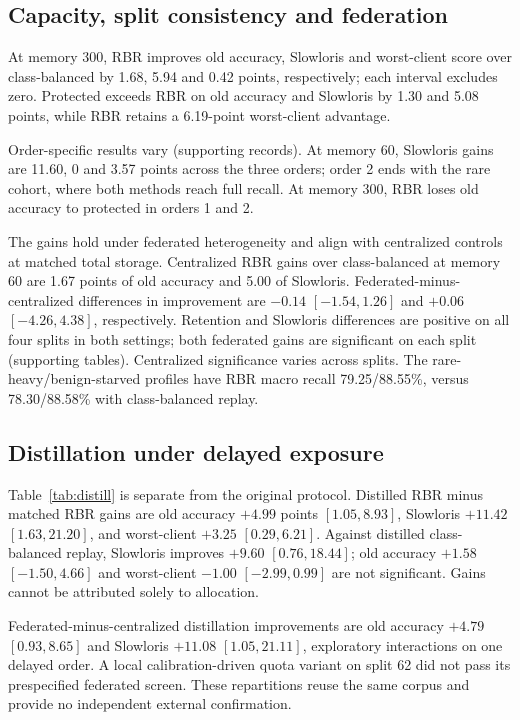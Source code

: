 \documentclass[journal,10pt]{IEEEtran}
\begin{document}
\subsection{Capacity, split consistency and federation}

At memory 300, RBR improves old accuracy, Slowloris and worst-client score over class-balanced by 1.68, 5.94 and 0.42 points, respectively; each interval excludes zero. Protected exceeds RBR on old accuracy and Slowloris by 1.30 and 5.08 points, while RBR retains a 6.19-point worst-client advantage.

Order-specific results vary (supporting records). At memory 60, Slowloris gains are 11.60, 0 and 3.57 points across the three orders; order 2 ends with the rare cohort, where both methods reach full recall. At memory 300, RBR loses old accuracy to protected in orders 1 and 2.

The gains hold under federated heterogeneity and align with centralized controls at matched total storage. Centralized RBR gains over class-balanced at memory 60 are 1.67 points of old accuracy and 5.00 of Slowloris. Federated-minus-centralized differences in improvement are $-0.14$ $[-1.54,1.26]$ and $+0.06$ $[-4.26,4.38]$, respectively. Retention and Slowloris differences are positive on all four splits in both settings; both federated gains are significant on each split (supporting tables). Centralized significance varies across splits. The rare-heavy/benign-starved profiles have RBR macro recall 79.25/88.55\%, versus 78.30/88.58\% with class-balanced replay.



\subsection{Distillation under delayed exposure}

Table~\ref{tab:distill} is separate from the original protocol. Distilled RBR minus matched RBR gains are old accuracy $+4.99$ points $[1.05,8.93]$, Slowloris $+11.42$ $[1.63,21.20]$, and worst-client $+3.25$ $[0.29,6.21]$. Against distilled class-balanced replay, Slowloris improves $+9.60$ $[0.76,18.44]$; old accuracy $+1.58$ $[-1.50,4.66]$ and worst-client $-1.00$ $[-2.99,0.99]$ are not significant. Gains cannot be attributed solely to allocation.

Federated-minus-centralized distillation improvements are old accuracy $+4.79$ $[0.93,8.65]$ and Slowloris $+11.08$ $[1.05,21.11]$, exploratory interactions on one delayed order. A local calibration-driven quota variant on split 62 did not pass its prespecified federated screen. These repartitions reuse the same corpus and provide no independent external confirmation.
\end{document}
